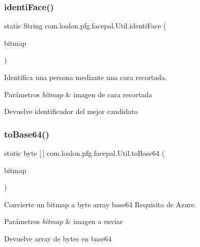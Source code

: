 \subsubsection{\texorpdfstring{identi\+Face()}{identiFace()}}
{\footnotesize\ttfamily static String com.\+loalon.\+pfg.\+facepal.\+Util.\+identi\+Face (\begin{DoxyParamCaption}\item[{Bitmap}]{bitmap }\end{DoxyParamCaption})\hspace{0.3cm}{\ttfamily [static]}}



Identifica una persona mediante una cara recortada. 


\begin{DoxyParams}{Parámetros}
{\em bitmap} & imagen de cara recortada \\
\hline
\end{DoxyParams}
\begin{DoxyReturn}{Devuelve}
identificador del mejor candidato 
\end{DoxyReturn}
\mbox{\label{classcom_1_1loalon_1_1pfg_1_1facepal_1_1_util_a363e942720417034c6c52fe4dd21df31}} 
\subsubsection{\texorpdfstring{to\+Base64()}{toBase64()}}
{\footnotesize\ttfamily static byte \mbox{[}$\,$\mbox{]} com.\+loalon.\+pfg.\+facepal.\+Util.\+to\+Base64 (\begin{DoxyParamCaption}\item[{Bitmap}]{bitmap }\end{DoxyParamCaption})\hspace{0.3cm}{\ttfamily [static]}}



Convierte un bitmap a byte array base64 Requisito de Azure. 


\begin{DoxyParams}{Parámetros}
{\em bitmap} & imagen a enviar \\
\hline
\end{DoxyParams}
\begin{DoxyReturn}{Devuelve}
array de bytes en base64 
\end{DoxyReturn}
\mbox{\label{classcom_1_1loalon_1_1pfg_1_1facepal_1_1_util_a59c6bb634708c5835281c91ead1b80bf}} 
